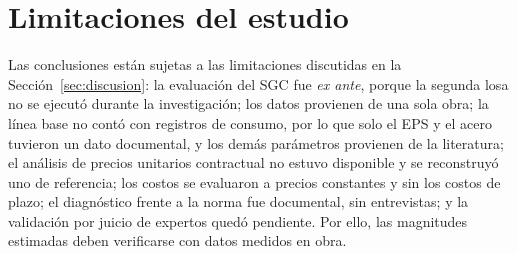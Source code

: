 \section{Limitaciones del estudio}

Las conclusiones están sujetas a las limitaciones discutidas en la Sección~\ref{sec:discusion}: la evaluación del SGC fue \emph{ex ante}, porque la segunda losa no se ejecutó durante la investigación; los datos provienen de una sola obra; la línea base no contó con registros de consumo, por lo que solo el EPS y el acero tuvieron un dato documental, y los demás parámetros provienen de la literatura; el análisis de precios unitarios contractual no estuvo disponible y se reconstruyó uno de referencia; los costos se evaluaron a precios constantes y sin los costos de plazo; el diagnóstico frente a la norma fue documental, sin entrevistas; y la validación por juicio de expertos quedó pendiente. Por ello, las magnitudes estimadas deben verificarse con datos medidos en obra.

\renewcommand{\thesection}{\thechapter.\arabic{section}}
